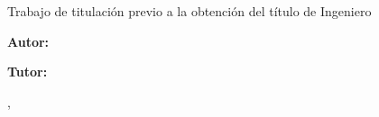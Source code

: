 \begin{titlepage}
  \centering
  {\Large\bfseries \universidad\par}
  \vspace{0.4cm}
  {\large \facultad\par}
  {\large \carrera\par}
  \vspace{3cm}
  {\LARGE\bfseries \titulo\par}
  \vspace{1.5cm}
  {\large Trabajo de titulación previo a la obtención del título de Ingeniero\par}
  \vfill
  {\large \textbf{Autor:} \autor\par}
  \vspace{0.3cm}
  {\large \textbf{Tutor:} \tutor\par}
  \vspace{2cm}
  {\large \ciudad, \anio\par}
\end{titlepage}
